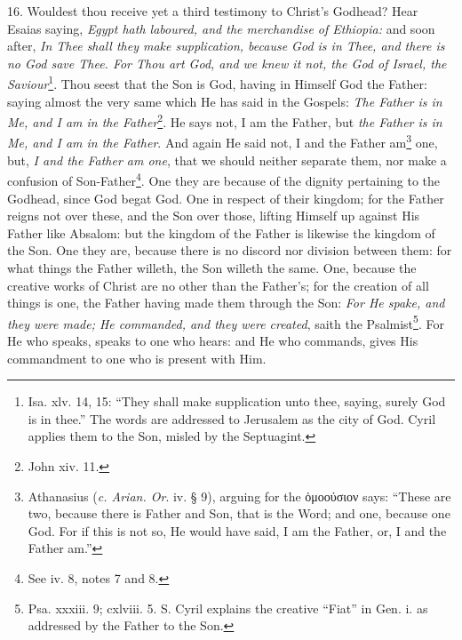 16. Wouldest thou receive yet a third testimony to Christ’s Godhead? Hear Esaias saying, \emph{Egypt hath laboured, and the merchandise of Ethiopia:} and soon after, \emph{In Thee shall they make supplication, because God is in Thee, and there is no God save Thee. For Thou art God, and we knew it not, the God of Israel, the Saviour}\footnote{Isa. xlv. 14, 15: “They shall make supplication unto thee, saying, surely God is in thee.” The words are addressed to Jerusalem as the city of God. Cyril applies them to the Son, misled by the Septuagint.}. Thou seest that the Son is God, having in Himself God the Father: saying almost the very same which He has said in the Gospels: \emph{The Father is in Me, and I am in the Father}\footnote{John xiv. 11.}. He says not, I am the Father, but \emph{the Father is in Me, and I am in the Father}. And again He said not, I and the Father am\footnote{Athanasius (\emph{c. Arian. Or}. iv. § 9), arguing for the \textgreek{ὁμοούσιον} says: “These are two, because there is Father and Son, that is the Word; and one, because one God. For if this is not so, He would have said, I am the Father, or, I and the Father am.”} one, but, \emph{I and the Father am one}, that we should neither separate them, nor make a confusion of Son-Father\footnote{See iv. 8, notes 7 and 8.}. One they are because of the dignity pertaining to the Godhead, since God begat God. One in respect of their kingdom; for the Father reigns not over these, and the Son over those, lifting Himself up against His Father like Absalom: but the kingdom of the Father is likewise the kingdom of the Son. One they are, because there is no discord nor division between them: for what things the Father willeth, the Son willeth the same. One, because the creative works of Christ are no other than the Father’s; for the creation of all things is one, the Father having made them through the Son: \emph{For He spake, and they were made; He commanded, and they were created}, saith the Psalmist\footnote{Psa. xxxiii. 9; cxlviii. 5. S. Cyril explains the creative “Fiat” in Gen. i. as addressed by the Father to the Son.}. For He who speaks, speaks to one who hears: and He who commands, gives His commandment to one who is present with Him.

